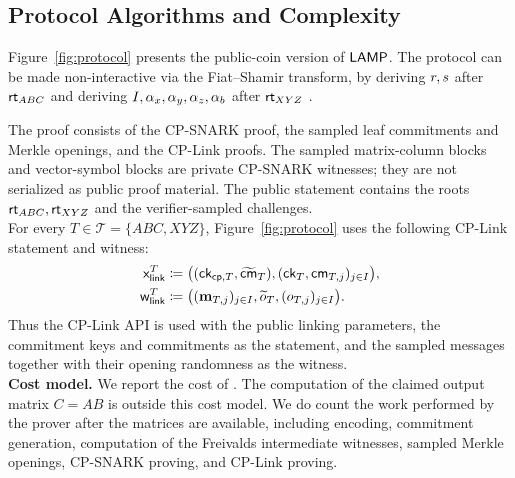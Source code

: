 \subsection{Protocol Algorithms and Complexity}
\label{sec:protocol-complexity}
Figure~\ref{fig:protocol} presents the public-coin version of
\(\textsf{LAMP}\).  The protocol can be made non-interactive via the
Fiat--Shamir transform, by deriving \(r, s\) after \(\textsf{rt}_{ABC}\) and deriving
\(I,\alpha_x,\alpha_y,\alpha_z, \alpha_b\) after \(\textsf{rt}_{XYZ}\)
 .

The proof consists of the CP-SNARK proof, the sampled leaf commitments and
Merkle openings, and the CP-Link proofs.  The sampled matrix-column blocks and
vector-symbol blocks are private CP-SNARK witnesses; they are not serialized as
public proof material.
The public statement contains the roots
\(\textsf{rt}_{ABC},\textsf{rt}_{XYZ}\) and the verifier-sampled challenges. \\

For every \(T\in\mathcal{T}=\{ABC,XYZ\}\), Figure~\ref{fig:protocol} uses the
following CP-Link statement and witness:
\[
\begin{aligned}
  \mathsf{x}_{\mathsf{link}}^T
  &\coloneqq
  \big(
    ({\textsf{ck}}_{{\mathsf{cp}},T},\widetilde{\textsf{cm}}_{T}),
    ({\textsf{ck}}_T,\textsf{cm}_{T,j})_{j\in I}
  \big),\\
  \mathsf{w}_{\mathsf{link}}^T
  &\coloneqq
  \big(
    (\mathbf{m}_{T,j})_{j\in I},
    \widetilde{o}_{T},
    (o_{T,j})_{j\in I}
  \big).
\end{aligned}
\]
Thus the CP-Link API is used with the public linking parameters, the commitment
keys and commitments as the statement, and the sampled messages together with
their opening randomness as the witness. \\

\noindent\textbf{Cost model.}
We report the cost of \protocol.  The computation of the claimed output matrix \(C=AB\) is outside this cost model.  
We do count the work performed by the \protocol{} prover after the matrices are available, including encoding, commitment generation, computation of the Freivalds intermediate witnesses, sampled Merkle openings, CP-SNARK proving, and CP-Link proving.

